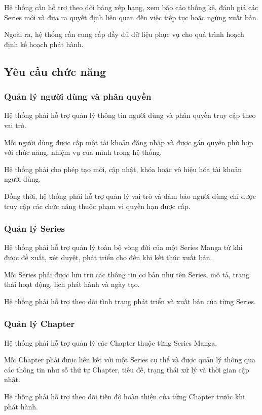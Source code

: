 \documentclass[12pt,a4paper]{article}
\begin{document}
Hệ thống cần hỗ trợ theo dõi bảng xếp hạng, xem báo cáo thống kê, đánh giá các Series mới và đưa ra quyết định liên quan đến việc tiếp tục hoặc ngừng xuất bản.

Ngoài ra, hệ thống cần cung cấp đầy đủ dữ liệu phục vụ cho quá trình hoạch định kế hoạch phát hành.

\subsection{Yêu cầu chức năng}

\subsubsection{Quản lý người dùng và phân quyền}
Hệ thống phải hỗ trợ quản lý thông tin người dùng và phân quyền truy cập theo vai trò.

Mỗi người dùng được cấp một tài khoản đăng nhập và được gán quyền phù hợp với chức năng, nhiệm vụ của mình trong hệ thống.

Hệ thống phải cho phép tạo mới, cập nhật, khóa hoặc vô hiệu hóa tài khoản người dùng.

Đồng thời, hệ thống phải hỗ trợ quản lý vai trò và đảm bảo người dùng chỉ được truy cập các chức năng thuộc phạm vi quyền hạn được cấp.

\subsubsection{Quản lý Series}
Hệ thống phải hỗ trợ quản lý toàn bộ vòng đời của một Series Manga từ khi được đề xuất, xét duyệt, phát triển cho đến khi kết thúc xuất bản.

Mỗi Series phải được lưu trữ các thông tin cơ bản như tên Series, mô tả, trạng thái hoạt động, lịch phát hành và ngày tạo.

Hệ thống phải hỗ trợ theo dõi tình trạng phát triển và xuất bản của từng Series.

\subsubsection{Quản lý Chapter}
Hệ thống phải hỗ trợ quản lý các Chapter thuộc từng Series Manga.

Mỗi Chapter phải được liên kết với một Series cụ thể và được quản lý thông qua các thông tin như số thứ tự Chapter, tiêu đề, trạng thái xử lý và thời gian cập nhật.

Hệ thống phải hỗ trợ theo dõi tiến độ hoàn thiện của từng Chapter trước khi phát hành.
\end{document}
